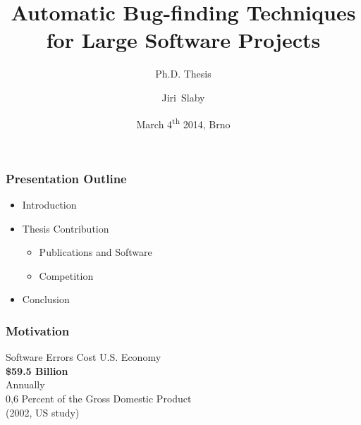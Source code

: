 \documentclass[xcolor=dvipsnames]{beamer}
\title{Automatic Bug-finding Techniques \\ for Large Software Projects}
\subtitle{Ph.D. Thesis}
\date{March 4\textsuperscript{th} 2014, Brno}
\author{Jiri~Slaby}
\institute{Faculty of Informatics\\
Masaryk University}
\begin{document}
\begin{frame}
  \titlepage
\end{frame}


\begin{frame}
  \frametitle{Presentation Outline}
  \begin{itemize}
    \item Introduction

    \pause

    \item Thesis Contribution
    \begin{itemize}
      \item Publications and Software
      \item Competition
    \end{itemize}

    \pause

    \item Conclusion
  \end{itemize}

\end{frame}

\begin{frame}
  \frametitle{Motivation}

  \begin{center}
    \Large{Software Errors Cost U.S. Economy}\\[1.3ex]
    \textbf{\LARGE\$59.5 Billion}\\[1ex]
    \Large{Annually}\\[4ex]

    \small{0,6 Percent of the Gross Domestic Product}\\[1ex]

    \scriptsize{(2002, US study)}
  \end{center}

\end{frame}
\end{document}
